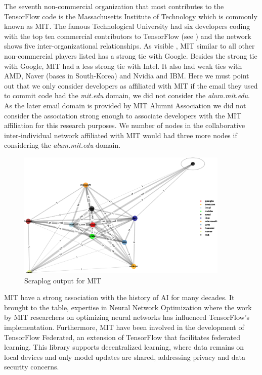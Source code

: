 \documentclass[CHICAGO,Times1COL]{WileyNJDv5} %
\begin{document}
The seventh non-commercial organization that most contributes to the TensorFlow code is the  Massachusetts Institute of Technology which is commonly known as MIT.  The famous Technological University had six developers coding with the top ten commercial contributors to TensorFlow (see ) and the network shows five inter-organizational relationships. 
As visible , MIT similar to all other non-commercial players listed  has a strong tie with Google.  Besides the strong tie with Google, MIT had a less strong tie with Intel. It also had weak ties with AMD, Naver (bases in South-Korea) and Nvidia and IBM. Here we must point out that we only consider developers as affiliated with MIT if the email they used to commit code had the \textit{mit.edu} domain, we did not consider the \textit{alum.mit.edu}.  As the later email domain is provided by MIT Alumni Association we did not consider the association strong enough to associate developers with the MIT affiliation for this research purposes. We number of nodes in the collaborative inter-individual network affiliated with MIT would had three more nodes if considering the \textit{alum.mit.edu} domain. 



\begin{figure}[h]
\centering
\includegraphics[keepaspectratio=true,width=0.9\textwidth]{./Figures/noo/mit_cropped.pdf}
\caption{Scraplog output for MIT}
\label{fig:mit}
\end{figure}



MIT have a strong association with the history of \ac{AI} for many decades. It brought to the table, expertise in Neural Network Optimization where the work by MIT researchers on optimizing neural networks has influenced TensorFlow's implementation.  Furthermore, MIT have been involved in the development of TensorFlow Federated, an extension of TensorFlow that facilitates federated learning. This library supports decentralized learning, where data remains on local devices and only model updates are shared, addressing privacy and data security concerns. 
\end{document}

